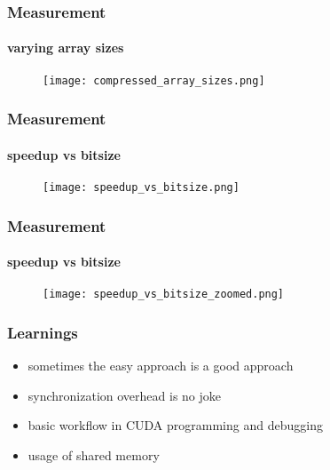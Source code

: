 \documentclass{beamer}
\begin{document}
\begin{frame}
    \frametitle{Measurement}
    \framesubtitle{varying array sizes}
     \begin{figure}
         \centering
         \texttt{[image: compressed\_array\_sizes.png]} %
     \end{figure}
\end{frame}

\begin{frame}
    \frametitle{Measurement}
    \framesubtitle{speedup vs bitsize}
    \begin{figure}
        \centering
        \texttt{[image: speedup\_vs\_bitsize.png]} %
    \end{figure}
\end{frame}

\begin{frame}
    \frametitle{Measurement}
    \framesubtitle{speedup vs bitsize}
    \begin{figure}
        \centering
        \texttt{[image: speedup\_vs\_bitsize\_zoomed.png]} %
    \end{figure}
\end{frame}

\begin{frame}
    \frametitle{Learnings}
    \begin{itemize}
        \item sometimes the easy approach is a good approach
        \item synchronization overhead is no joke
        \item basic workflow in CUDA programming and debugging
        \item usage of shared memory
    \end{itemize}
\end{frame}
\end{document}
